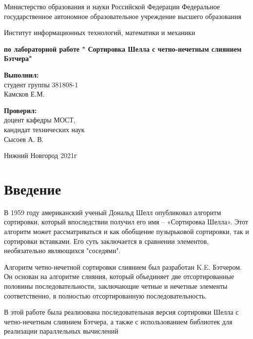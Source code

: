 \documentclass{report}
\begin{document}
\begin{titlepage}

\begin{center}Министерство образования и науки Российской Федерации 
Федеральное государственное автономное образовательное учреждение 
высшего образования 

\begin{center}
{Институт информационных технологий, математики и механики}
\end{center}

\vspace{8em}
\textbf{ по лабораторной работе "
Сортировка Шелла с четно-нечетным слиянием Бэтчера"} \end{center}

\vspace{8em}

\begin{flushright}  \textbf{Выполнил:} \\ студент группы 381808-1  \\ Камсков Е.М. \end{flushright}
\begin{flushright}  \textbf{Проверил:}  \\ доцент кафедры МОСТ, \\ кандидат технических наук \\ Сысоев А. В.\\ \end{flushright}

\vspace{\fill}
\begin{center} Нижний Новгород  2021г \end{center}
\end{titlepage}

\setcounter{page}{2}

\tableofcontents

\newpage
\section*{Введение}
В 1959 году американский ученый Дональд Шелл опубликовал алгоритм сортировки, который впоследствии получил его имя – «Сортировка Шелла». Этот алгоритм может рассматриваться и как обобщение пузырьковой сортировки, так и сортировки вставками. Его суть заключается в сравнении элементов, необязательно являющихся "соседями".
\par Алгоритм четно-нечетной сортировки слиянием был разработан K.E. Бэтчером. Он основан на алгоритме слияния, который объединяет две отсортированные половины последовательности, заключающие четные и нечетные элементы соответственно, в полностью отсортированную последовательность.
\par В этой работе была реализована последовательная версия сортировки Шелла с четно-нечетным слиянием Бэтчера, а также с использованием библиотек для реализации параллельных вычислений
\end{document}

